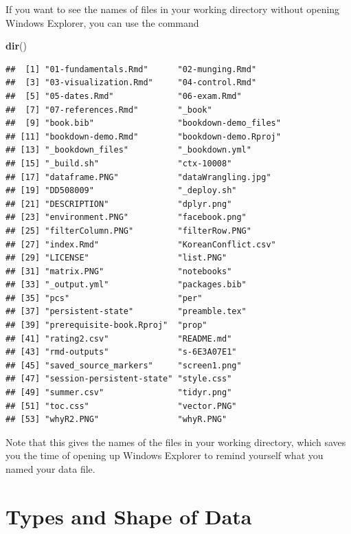 \documentclass[]{book}
\newenvironment{Shaded}{\begin{snugshade}}{\end{snugshade}}
\newcommand{\KeywordTok}[1]{\textcolor[rgb]{0.13,0.29,0.53}{\textbf{{#1}}}}
\newcommand{\NormalTok}[1]{{#1}}
\begin{document}
If you want to see the names of files in your working directory without
opening Windows Explorer, you can use the command

\begin{Shaded}
\begin{Highlighting}[]
\KeywordTok{dir}\NormalTok{()}
\end{Highlighting}
\end{Shaded}

\begin{verbatim}
##  [1] "01-fundamentals.Rmd"      "02-munging.Rmd"          
##  [3] "03-visualization.Rmd"     "04-control.Rmd"          
##  [5] "05-dates.Rmd"             "06-exam.Rmd"             
##  [7] "07-references.Rmd"        "_book"                   
##  [9] "book.bib"                 "bookdown-demo_files"     
## [11] "bookdown-demo.Rmd"        "bookdown-demo.Rproj"     
## [13] "_bookdown_files"          "_bookdown.yml"           
## [15] "_build.sh"                "ctx-10008"               
## [17] "dataframe.PNG"            "dataWrangling.jpg"       
## [19] "DD508009"                 "_deploy.sh"              
## [21] "DESCRIPTION"              "dplyr.png"               
## [23] "environment.PNG"          "facebook.png"            
## [25] "filterColumn.PNG"         "filterRow.PNG"           
## [27] "index.Rmd"                "KoreanConflict.csv"      
## [29] "LICENSE"                  "list.PNG"                
## [31] "matrix.PNG"               "notebooks"               
## [33] "_output.yml"              "packages.bib"            
## [35] "pcs"                      "per"                     
## [37] "persistent-state"         "preamble.tex"            
## [39] "prerequisite-book.Rproj"  "prop"                    
## [41] "rating2.csv"              "README.md"               
## [43] "rmd-outputs"              "s-6E3A07E1"              
## [45] "saved_source_markers"     "screen1.png"             
## [47] "session-persistent-state" "style.css"               
## [49] "summer.csv"               "tidyr.png"               
## [51] "toc.css"                  "vector.PNG"              
## [53] "whyR2.PNG"                "whyR.PNG"
\end{verbatim}

Note that this gives the names of the files in your working directory,
which saves you the time of opening up Windows Explorer to remind
yourself what you named your data file.

\section{Types and Shape of Data}\label{types-and-shape-of-data}
\end{document}
